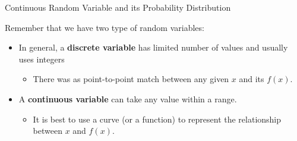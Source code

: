 \documentclass{beamer}
\begin{document}
\begin{frame}{Continuous Random Variable and its Probability Distribution}

Remember that we have two type of random variables: 
\begin{itemize}

\item In general, a \textbf{discrete variable} has limited number of values and usually uses integers

\begin{itemize}
\item There was as point-to-point match between any given $x$ and its $f(x)$.
\end{itemize}

\item A \textbf{continuous variable} can take any value within a range.
\begin{itemize}
\item It is best to use a curve (or a function) to represent the relationship between $x$ and $f(x)$.
\end{itemize}

\end{itemize}

\end{frame}
\end{document}
